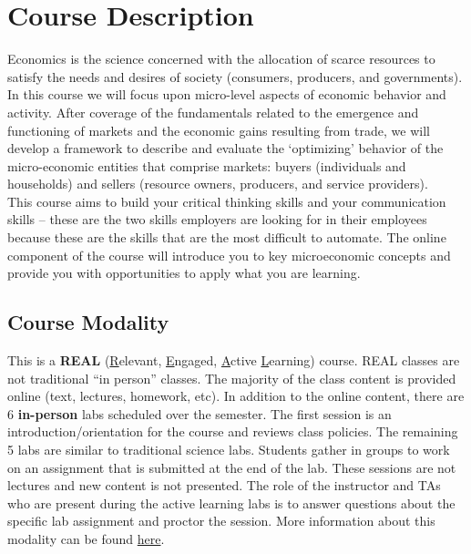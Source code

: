 \documentclass[11pt]{paper}
\begin{document}
\newpage

\tableofcontents

\newpage

\section{Course Description}

Economics is the science concerned with the allocation of scarce resources to satisfy the needs and desires of society (consumers, producers, and governments). In this course we will focus upon micro-level aspects of economic behavior and activity. After coverage of the fundamentals related to the emergence and functioning of markets and the economic gains resulting from trade, we will develop a framework to describe and evaluate the ‘optimizing’ behavior of the micro-economic entities that comprise markets: buyers (individuals and households) and sellers (resource owners, producers, and service providers).\\

This course aims to build your critical thinking skills and your communication skills – these are the two skills employers are looking for in their employees because these are the skills that are the most difficult to automate. The online component of the course will introduce you to key microeconomic concepts and provide you with opportunities to apply what you are learning.

\subsection{Course Modality}

This is a \textbf{REAL} (\underline{R}elevant, \underline{E}ngaged, \underline{A}ctive \underline{L}earning) course. REAL classes are not traditional ``in person'' classes. The majority of the class content is provided online (text, lectures, homework, etc). In addition to the online content, there are 6 \textbf{in-person} labs scheduled over the semester. The first session is an introduction/orientation for the course and reviews class policies. The remaining 5 labs are similar to traditional science labs. Students gather in groups to work on an assignment that is submitted at the end of the lab. These sessions are not lectures and new content is not presented. The role of the instructor and TAs who are present during the active learning labs is to answer questions about the specific lab assignment and proctor the session. More information about this modality can be found \href{https://youtu.be/vuOArqNs4mQ}{here}.
\end{document}
